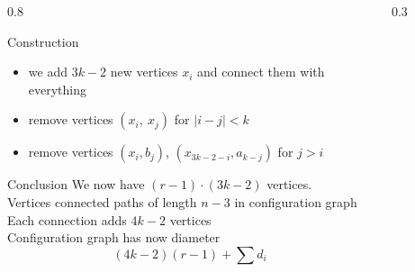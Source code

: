 \begin{frame}{}
\begin{columns}
    \begin{column}{0.8\textwidth}
        \begin{heading}{Construction}
        \begin{itemize}
            \item we add \(3k-2\) new vertices \(x_i\) and connect them with everything
            \item remove vertices \((x_i,\ x_j)\) for \(|i-j|<k\)
            \item remove vertices \((x_i,b_j)\), \((x_{3k-2-i}, a_{k-j})\) for \(j>i\)
        \end{itemize}
        \end{heading}
        \begin{heading}{Conclusion}
            We now have \((r-1) \cdot (3k-2)\) vertices.\\
            Vertices connected paths of length \(n-3\) in configuration graph \\
            Each connection adds \(4k-2\) vertices\\
            Configuration graph has now diameter
            \vspace{-1em}
            \[(4k-2)(r-1)+\sum d_i\]
        \end{heading}
    \end{column}
    \begin{column}{0.3\textwidth}
        \begin{figure}
            \centering
            
        \end{figure}
    \end{column}
\end{columns}
\end{frame}
